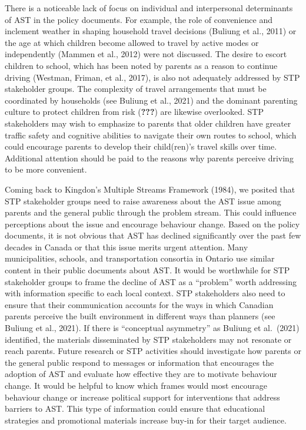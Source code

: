 \documentclass[]{elsarticle} %
\begin{document}
There is a noticeable lack of focus on individual and interpersonal
determinants of AST in the policy documents. For example, the role of
convenience and inclement weather in shaping household travel decisions
(Buliung et al., 2011) or the age at which children become allowed to
travel by active modes or independently (Mammen et al., 2012) were not
discussed. The desire to escort children to school, which has been noted
by parents as a reason to continue driving (Westman, Friman, et al.,
2017), is also not adequately addressed by STP stakeholder groups. The
complexity of travel arrangements that must be coordinated by households
(see Buliung et al., 2021) and the dominant parenting culture to protect
children from risk ({\textbf{???}}) are likewise overlooked. STP
stakeholders may wish to emphasize to parents that older children have
greater traffic safety and cognitive abilities to navigate their own
routes to school, which could encourage parents to develop their
child(ren)'s travel skills over time. Additional attention should be
paid to the reasons why parents perceive driving to be more convenient.

Coming back to Kingdon's Multiple Streams Framework (1984), we posited
that STP stakeholder groups need to raise awareness about the AST issue
among parents and the general public through the problem stream. This
could influence perceptions about the issue and encourage behaviour
change. Based on the policy documents, it is not obvious that AST has
declined significantly over the past few decades in Canada or that this
issue merits urgent attention. Many municipalities, schools, and
transportation consortia in Ontario use similar content in their public
documents about AST. It would be worthwhile for STP stakeholder groups
to frame the decline of AST as a ``problem'' worth addressing with
information specific to each local context. STP stakeholders also need
to ensure that their communication accounts for the ways in which
Canadian parents perceive the built environment in different ways than
planners (see Buliung et al., 2021). If there is ``conceptual
asymmetry'' as Buliung et al.~(2021) identified, the materials
disseminated by STP stakeholders may not resonate or reach parents.
Future research or STP activities should investigate how parents or the
general public respond to messages or information that encourages the
adoption of AST and evaluate how effective they are to motivate
behaviour change. It would be helpful to know which frames would most
encourage behaviour change or increase political support for
interventions that address barriers to AST. This type of information
could ensure that educational strategies and promotional materials
increase buy-in for their target audience.
\end{document}
